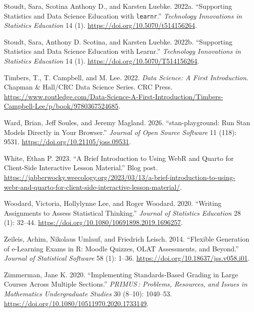 \documentclass[
  letterpaper,
  DIV=11,
  numbers=noendperiod]{scrartcl}
\newlength{\cslhangindent}
\newenvironment{CSLReferences}[2] %
 {\begin{list}{}{%
  \setlength{\itemindent}{0pt}
  \setlength{\leftmargin}{0pt}
  \setlength{\parsep}{0pt}
  \ifodd #1
   \setlength{\leftmargin}{\cslhangindent}
   \setlength{\itemindent}{-1\cslhangindent}
  \fi
  \setlength{\itemsep}{#2\baselineskip}}}
 {\end{list}}
\begin{document}
\begin{CSLReferences}{1}{0}
Stoudt, Sara, Scotina Anthony D., and Karsten Luebke. 2022a.
{``Supporting Statistics and Data Science Education with
\texttt{learnr}.''} \emph{Technology Innovations in Statistics
Education} 14 (1). \url{https://doi.org/10.5070/t514156264}.

Stoudt, Sara, Anthony D. Scotina, and Karsten Luebke. 2022b.
{``Supporting Statistics and Data Science Education with Learnr.''}
\emph{Technology Innovations in Statistics Education} 14 (1).
\url{https://doi.org/10.5070/T514156264}.

Timbers, T., T. Campbell, and M. Lee. 2022. \emph{Data Science: A First
Introduction}. Chapman \& Hall/CRC Data Science Series. CRC Press.
\url{https://www.routledge.com/Data-Science-A-First-Introduction/Timbers-Campbell-Lee/p/book/9780367524685}.

Ward, Brian, Jeff Soules, and Jeremy Magland. 2026.
{``{stan-playground}: Run Stan Models Directly in Your Browser.''}
\emph{Journal of Open Source Software} 11 (118): 9531.
\url{https://doi.org/10.21105/joss.09531}.

White, Ethan P. 2023. {``A Brief Introduction to Using WebR and Quarto
for Client-Side Interactive Lesson Material.''} Blog post.
\url{https://jabberwocky.weecology.org/2023/03/13/a-brief-introduction-to-using-webr-and-quarto-for-client-side-interactive-lesson-material/}.

Woodard, Victoria, Hollylynne Lee, and Roger Woodard. 2020. {``Writing
Assignments to Assess Statistical Thinking.''} \emph{Journal of
Statistics Education} 28 (1): 32--44.
\url{https://doi.org/10.1080/10691898.2019.1696257}.

Zeileis, Achim, Nikolaus Umlauf, and Friedrich Leisch. 2014. {``Flexible
Generation of e-Learning Exams in {R}: {M}oodle Quizzes, {OLAT}
Assessments, and Beyond.''} \emph{Journal of Statistical Software} 58
(1): 1--36. \url{https://doi.org/10.18637/jss.v058.i01}.

Zimmerman, Jane K. 2020. {``Implementing Standards-Based Grading in
Large Courses Across Multiple Sections.''} \emph{PRIMUS\,: Problems,
Resources, and Issues in Mathematics Undergraduate Studies} 30 (8--10):
1040--53. \url{https://doi.org/10.1080/10511970.2020.1733149}.

\end{CSLReferences}
\end{document}
